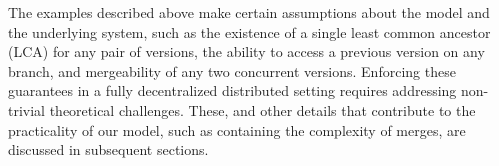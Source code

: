 The examples described above make certain assumptions about the model
and the underlying system, such as the existence of a single least
common ancestor (LCA) for any pair of versions, the ability to access
a previous version on any branch, and mergeability of any two
concurrent versions. Enforcing these guarantees in a fully
decentralized distributed setting requires addressing non-trivial
theoretical challenges. These, and other details that contribute to
the practicality of our model, such as containing the complexity of
merges, are discussed in subsequent sections.

